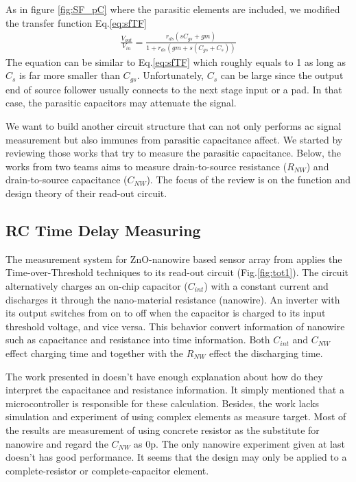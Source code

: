 As in figure \ref{fig:SF_pC} where the parasitic elements are included, we modified the transfer function Eq.\ref{eq:sfTF}
\begin{align}
    \frac{V_{out}}{V_{in}} = \frac{r_{ds}(sC_{gs} + gm)}{1 + r_{ds}(gm + s(C_{gs}+C_s))}
\end{align}
The equation can be similar to Eq.\ref{eq:sfTF} which roughly equals to 1 as long as $C_s$ is far more smaller than $C_{gs}$.
Unfortunately, $C_s$ can be large since the output end of source follower usually connects to the next stage input or a pad.
In that case, the parasitic capacitors may attenuate the signal.

We want to build another circuit structure that can not only performs ac signal measurement but also immunes from parasitic capacitance affect.
We started by reviewing those works that try to measure the parasitic capacitance.
Below, the works from two teams aims to measure drain-to-source resistance ($R_{NW}$) and drain-to-source capacitance ($C_{NW}$).
The focus of the review is on the function and design theory of their read-out circuit.


\subsection{RC Time Delay Measuring}
The measurement system for ZnO-nanowire based sensor array from \cite{Juv1} applies the Time-over-Threshold techniques to its read-out circuit (Fig.\ref{fig:tot1}).
The circuit alternatively charges an on-chip capacitor ($C_{int}$) with a constant current and discharges it through the nano-material resistance (nanowire).
An inverter with its output switches from on to off when the capacitor is charged to its input threshold voltage, and vice versa.
This behavior convert information of nanowire such as capacitance and resistance into time information.
Both $C_{int}$ and $C_{NW}$ effect charging time and together with the $R_{NW}$ effect the discharging time.

The work presented in \cite{Juv1} doesn't have enough explanation about how do they interpret the capacitance and resistance information.
It simply mentioned that a microcontroller is responsible for these calculation.
Besides, the work lacks simulation and experiment of using complex elements as measure target.
Most of the results are measurement of using concrete resistor as the substitute for nanowire and regard the $C_{NW}$ as 0p.
The only nanowire experiment given at last doesn't has good performance.
It seems that the design may only be applied to a complete-resistor or complete-capacitor element.

